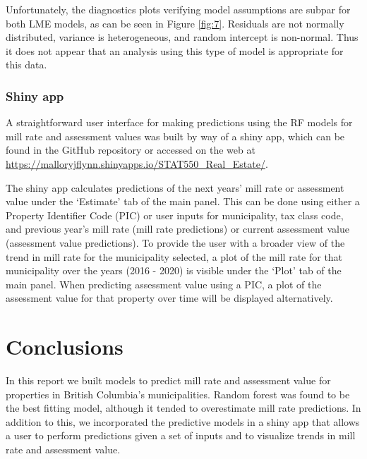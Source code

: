 \documentclass{article}
\begin{document}
Unfortunately, the diagnostics plots verifying model assumptions are subpar for both LME models, as can be seen in Figure \ref{fig:7}. Residuals are not normally distributed, variance is heterogeneous, and random intercept is non-normal.  Thus it does not appear that an analysis using this type of model is appropriate for this data.


\subsubsection{Shiny app}

A straightforward user interface for making predictions using the RF models for mill rate and assessment values was built by way of a shiny app, which can be found in the GitHub repository \citep{gitrepo} or accessed on the web at {\color{blue} \underline{\url{https://malloryjflynn.shinyapps.io/STAT550_Real_Estate/}}}. 

The shiny app calculates predictions of the next years' mill rate or assessment value under the `Estimate' tab of the main panel.  This can be done using either a Property Identifier Code (PIC) or user inputs for municipality, tax class code, and previous year's mill rate (mill rate predictions) or current assessment value (assessment value predictions).  To provide the user with a broader view of the trend in mill rate for the municipality selected, a plot of the mill rate for that municipality over the years (2016 - 2020) is visible under the `Plot' tab of the main panel.  When predicting assessment value using a PIC, a plot of the assessment value for that property over time will be displayed alternatively.


\section{Conclusions} \label{section:conclusion}

In this report we built models to predict mill rate and assessment value for properties in British Columbia's municipalities. Random forest was found to be the best fitting model, although it tended to overestimate mill rate predictions. In addition to this, we incorporated the predictive models in a shiny app that allows a user to perform predictions given a set of inputs and to visualize trends in mill rate and assessment value.
\end{document}
